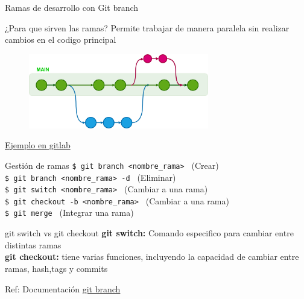 \documentclass{beamer}
\begin{document}
  \begin{frame}{Ramas de desarrollo con Git branch}

    \begin{alertblock}{¿Para que sirven las ramas?}
      Permite trabajar de manera paralela sin realizar cambios en el codigo principal
    \end{alertblock}


     \begin{figure}
      \includegraphics[width=0.7\textwidth]{images/git-branch.png}
     \end{figure}

     \href{https://gitlab.com/blancoapa/pyMBE}{Ejemplo en gitlab}



  \end{frame}

  \begin{frame}
    
    \begin{block}{ Gestión de ramas }
      {\texttt{\$ git branch <nombre\_rama> }}  (Crear)\\
      {\texttt{\$ git branch <nombre\_rama> -d }} (Eliminar) \\
      {\texttt{\$ git switch <nombre\_rama> }} (Cambiar a una rama) \\
      {\texttt{\$ git checkout -b <nombre\_rama> }} (Cambiar a una rama) \\
      {\texttt{\$ git merge }} (Integrar una rama) \\
    \end{block}

    \begin{exampleblock}{git switch vs git checkout }
      \textbf{git switch:} Comando especifico para cambiar entre distintas ramas \\
      \textbf{git checkout:} tiene varias funciones, incluyendo la capacidad de cambiar entre ramas, hash,tags y commits
    \end{exampleblock}

    Ref: Documentación \href{https://docs.github.com/es/pull-requests/collaborating-with-pull-requests/proposing-changes-to-your-work-with-pull-requests/creating-and-deleting-branches-within-your-repository}{git branch} 
  
  \end{frame}
\end{document}
